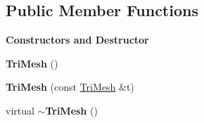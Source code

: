 \subsection*{Public Member Functions}
\begin{Indent}\textbf{ Constructors and Destructor}\par
\begin{DoxyCompactItemize}
\item 
\mbox{\label{classcy_1_1_tri_mesh_a10cf48530b128593d7d4cbd82c968027}} 
{\bfseries Tri\+Mesh} ()
\item 
\mbox{\label{classcy_1_1_tri_mesh_acb27c9ac4fae24649d4fbfb141b96b50}} 
{\bfseries Tri\+Mesh} (const \mbox{\hyperlink{classcy_1_1_tri_mesh}{Tri\+Mesh}} \&t)
\item 
\mbox{\label{classcy_1_1_tri_mesh_af5f1a49cbc1caeed92030e1090e7578d}} 
virtual {\bfseries $\sim$\+Tri\+Mesh} ()
\end{DoxyCompactItemize}
\end{Indent}
